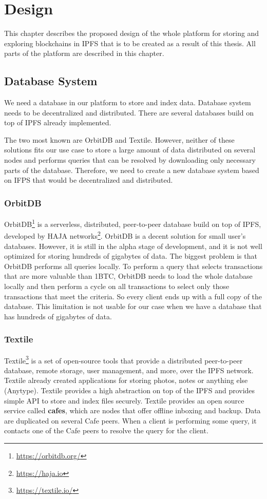 \chapter{Design}
\label{Design}
This chapter describes the proposed design of the whole platform for storing and exploring blockchains in IPFS that is to be created as a result of this thesis. All parts of the platform are described in this chapter.

\section{Database System}
We need a database in our platform to store and index data. Database system needs to be decentralized and distributed. There are several databases build on top of IPFS already implemented. 

The two most known are OrbitDB and Textile. However, neither of these solutions fits our use case to store a large amount of data distributed on several nodes and performs queries that can be resolved by downloading only necessary parts of the database. Therefore, we need to create a new database system based on IFPS that would be decentralized and distributed. 

\subsection{OrbitDB}
OrbitDB\footnote{\url{https://orbitdb.org/}} \cite{OrbitDBManual} is a serverless, distributed, peer-to-peer database build on top of IPFS, developed by HAJA networks\footnote{\url{https://haja.io}}. OrbitDB is a decent solution for small user's databases. However, it is still in the alpha stage of development, and it is not well optimized for storing hundreds of gigabytes of data. The biggest problem is that OrbitDB performs all queries locally. To perform a query that selects transactions that are more valuable than 1BTC, OrbitDB needs to load the whole database locally and then perform a cycle on all transactions to select only those transactions that meet the criteria. So every client ends up with a full copy of the database. This limitation is not usable for our case when we have a database that has hundreds of gigabytes of data.

\subsection{Textile}
Textile\footnote{\url{https://textile.io/}} is a set of open-source tools that provide a distributed peer-to-peer database, remote storage, user management, and more, over the IPFS network. Textile already created applications for storing photos, notes or anything else (Anytype). Textile provides a high abstraction on top of the IPFS and provides simple API to store and index files securely. Textile provides an open source service called \textbf{cafes}, which are nodes that offer offline inboxing and backup. Data are duplicated on several Cafe peers. When a client is performing some query, it contacts one of the Cafe peers to resolve the query for the client. 
\cite{TextileWhitePaper}

